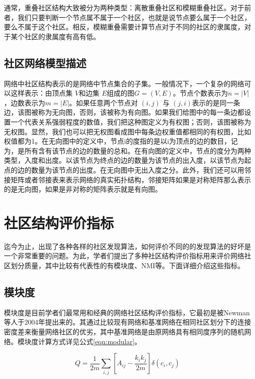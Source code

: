   通常，重叠社区结构大致被分为两种类型：离散重叠社区和模糊重叠社区。对于前者，我们只要判断一个节点属不属于一个社区，也就是说节点要么属于一个社区，要么不属于这个社区。相反，模糊重叠需要计算节点对于不同的社区的隶属度，对于某个社区的隶属度有高有低。

\subsection{社区网络模型描述}

网络中社区结构表示的是网络中节点集合的子集。一般情况下，一个复杂的网络可以这样表示：由顶点集 $V$和边集 $E$组成的图$G=(V,E)$。节点个数表示为$n=|V|$，边数表示为$m=|E|$。如果任意两个节点对 $(i, j)$ 与 $(j, i)$表示的是同一条边，该图被称为无向图，否则，该被称为有向图。如果我们给图中的每一条边都设置一个代表关系强弱程度的数值，我们把这种图定义为有权图；否则，该图被称为无权图。显然，我们也可以把无权图看成图中每条边权重值都相同的有权图，比如权值都为1。在无向图中的定义中，节点i的度指的是以i为顶点的边的数目，记为，是所有含有该节点的边的数量的总和。在有向图的定义中，节点的度分为两种类型，入度和出度。以该节点为终点的边的数量为该节点的出入度，以该节点为起点的边的数量为该节点的出度。在无向图中无出入度之分。此外，我们还可以用邻接矩阵或者邻接表来表示网络的真实拓扑结构，邻接矩阵如果是对称矩阵那么表示的是无向图，如果是非对称的矩阵表示就是有向图。

\section{社区结构评价指标}

迄今为止，出现了各种各样的社区发现算法，如何评价不同的的发现算法的好坏是一个非常重要的问题。为此，学者们提出了多种社区结构评价指标用来评价网络社区划分质量，其中比较有代表性的有模块度、NMI等。下面详细介绍这些指标。

\subsection{模块度}

模块度是目前学者们最常用和经典的网络社区结构评价指标，它最初是被Newman等人于2004年提出来的\cite{2002Community}。其通过比较现有网络和基准网络在相同社区划分下的连接密度差来衡量网络社区的优劣，其中基准网络是由原网络具有相同度序列的随机网络。模块度计算方式详见公式\ref{eqn:modular}。

\begin{equation}
  \label{eqn:modular}
  Q=\frac{1}{2m}\sum_{i,j}\left [ A_{ij}-\frac{k_ik_j}{2m} \right ]\delta (c_i, c_j)  
\end{equation}

